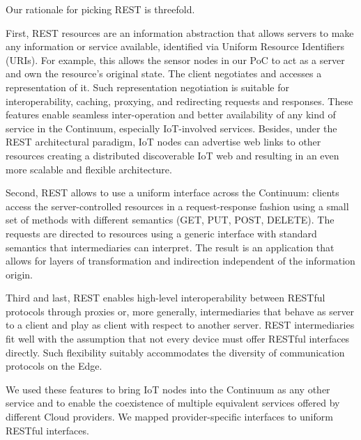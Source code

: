 Our rationale for picking REST is threefold.\par
First, REST resources are an information abstraction that allows servers to make any information or service available, identified via Uniform Resource Identifiers (URIs). For example, this allows the sensor nodes in our PoC to act as a server and own the resource's original state. The client negotiates and accesses a representation of it. Such representation negotiation is suitable for interoperability, caching, proxying, and redirecting requests and responses. These features enable seamless inter-operation and better availability of any kind of service in the Continuum, especially IoT-involved services. Besides, under the REST architectural paradigm, IoT nodes can advertise web links to other resources creating a distributed discoverable IoT web and resulting in an even more scalable and flexible architecture.\par
Second, REST allows to use a uniform interface across the Continuum: clients access the server-controlled resources in a request-response fashion using a small set of methods with different semantics (GET, PUT, POST, DELETE). The requests are directed to resources using a generic interface with standard semantics that intermediaries can interpret. The result is an application that allows for layers of transformation and indirection independent of the information origin. \par
Third and last, REST enables high-level interoperability between RESTful protocols through proxies or, more generally, intermediaries that behave as server to a client and play as client with respect to another server. REST intermediaries fit well with the assumption that not every device must offer RESTful interfaces directly. Such flexibility suitably accommodates the diversity of communication protocols on the Edge.

We used these features to bring IoT nodes into the Continuum as any other service and to enable the coexistence of multiple equivalent services offered by different Cloud providers. We mapped provider-specific interfaces to uniform RESTful interfaces.

